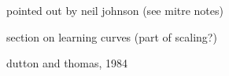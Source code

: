 pointed out by neil johnson (see mitre notes)

section on learning curves
(part of scaling?)

dutton and thomas, 1984


  



